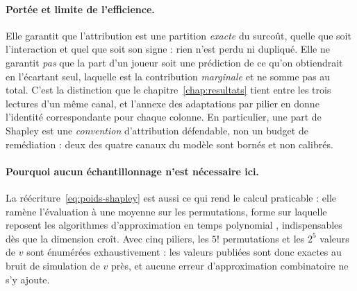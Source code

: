 \paragraph{Portée et limite de l'efficience.}
Elle garantit que l'attribution est une partition \emph{exacte} du surcoût, quelle que soit
l'interaction et quel que soit son signe : rien n'est perdu ni dupliqué. Elle ne garantit
\emph{pas} que la part d'un joueur soit une prédiction de ce qu'on obtiendrait en l'écartant
seul, laquelle est la contribution \emph{marginale} et ne somme pas au total. C'est la distinction
que le chapitre~\ref{chap:resultats} tient entre les trois lectures d'un même canal, et l'annexe
des adaptations par pilier en donne l'identité correspondante pour chaque colonne. En particulier,
une part de Shapley est une \emph{convention} d'attribution défendable, non un budget de
remédiation : deux des quatre canaux du modèle sont bornés et non calibrés.

\paragraph{Pourquoi aucun échantillonnage n'est nécessaire ici.}
La réécriture~\eqref{eq:poids-shapley} est aussi ce qui rend le calcul praticable : elle ramène
l'évaluation à une moyenne sur les permutations, forme sur laquelle reposent les algorithmes
d'approximation en temps polynomial \citep{CastroGomezTejada2009, SongNelsonStaum2016},
indispensables dès que la dimension croît. Avec cinq piliers, les $5!$ permutations et les $2^5$
valeurs de $v$ sont énumérées exhaustivement : les valeurs publiées sont donc exactes au bruit de
simulation de $v$ près, et aucune erreur d'approximation combinatoire ne s'y ajoute.

